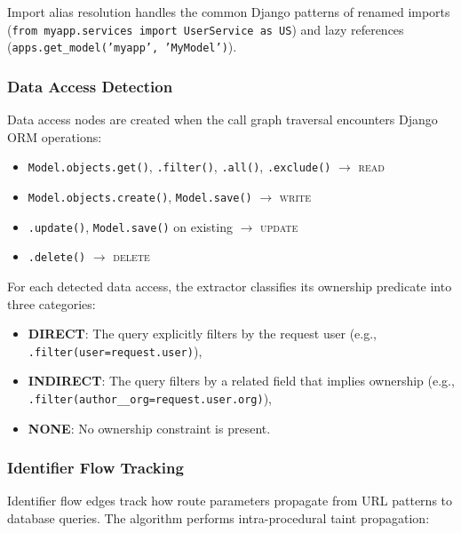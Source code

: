 Import alias resolution handles the common Django patterns of renamed imports (\texttt{from myapp.services import UserService as US}) and lazy references (\texttt{apps.get\_model('myapp', 'MyModel')}).

\subsubsection{Data Access Detection}

Data access nodes are created when the call graph traversal encounters Django ORM operations:
\begin{itemize}
    \item \texttt{Model.objects.get()}, \texttt{.filter()}, \texttt{.all()}, \texttt{.exclude()} $\to$ \textsc{read}
    \item \texttt{Model.objects.create()}, \texttt{Model.save()} $\to$ \textsc{write}
    \item \texttt{.update()}, \texttt{Model.save()} on existing $\to$ \textsc{update}
    \item \texttt{.delete()} $\to$ \textsc{delete}
\end{itemize}

For each detected data access, the extractor classifies its ownership predicate into three categories:
\begin{itemize}
    \item \textbf{DIRECT}: The query explicitly filters by the request user (e.g., \texttt{.filter(user=request.user)}),
    \item \textbf{INDIRECT}: The query filters by a related field that implies ownership (e.g., \texttt{.filter(author\_\_org=request.user.org)}),
    \item \textbf{NONE}: No ownership constraint is present.
\end{itemize}

\subsubsection{Identifier Flow Tracking}

Identifier flow edges track how route parameters propagate from URL patterns to database queries. The algorithm performs intra-procedural taint propagation:

